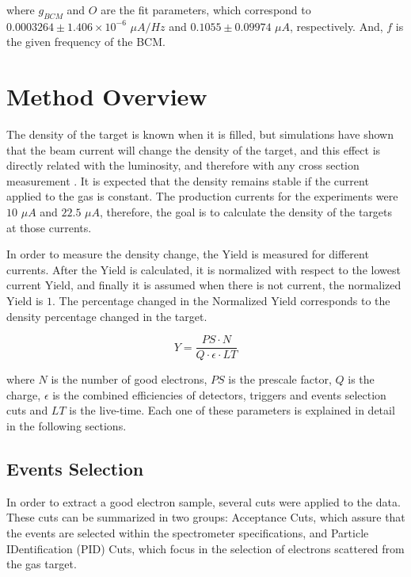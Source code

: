 \documentclass[final,5p,times,twocolumn]{elsarticle}
\begin{document}
\noindent where $g_{BCM}$ and $O$ are the fit parameters, which correspond to $0.0003264 \pm 1.406 \times 10^{-6}$ $\mu A/Hz$ and $0.1055 \pm 0.09974$  $\mu A$, respectively. And, $f$ is the given frequency of the BCM.

\section{Method Overview}

The density of the target is known when it is filled, but simulations have shown that the beam current will change the density of the target, and this effect is directly related with the luminosity, and therefore with any cross section measurement \cite{celldes}. It is expected that the density remains stable if the current applied to the gas is constant. The production currents for the experiments were $10$ $\mu A$ and $22.5$ $\mu A$, therefore, the goal is to calculate the density of the targets at those currents.  

In order to measure the density change, the Yield is measured for different currents. After the Yield is calculated, it is normalized with respect to the lowest current Yield, and finally it is assumed when there is not current, the normalized Yield is $1$. The percentage changed in the Normalized Yield corresponds to the density percentage changed in the target. 

\begin{equation}
Y = \frac{PS \cdot N}{ Q \cdot \epsilon \cdot LT }
\label{eq:yield}
\end{equation}

\noindent where $N$ is the number of good electrons, $PS$ is the prescale factor, $Q$ is the charge, $\epsilon $ is the combined efficiencies of detectors, triggers and events selection cuts and $LT$ is the live-time. Each one of these parameters is explained in detail in the following sections.

\subsection{Events Selection}
In order to extract a good electron sample, several cuts were applied to the data. These cuts can be summarized in two groups: Acceptance Cuts, which assure that the events are selected within the spectrometer specifications, and Particle IDentification (PID) Cuts, which focus in the selection of electrons scattered from the gas target. 
\end{document}
